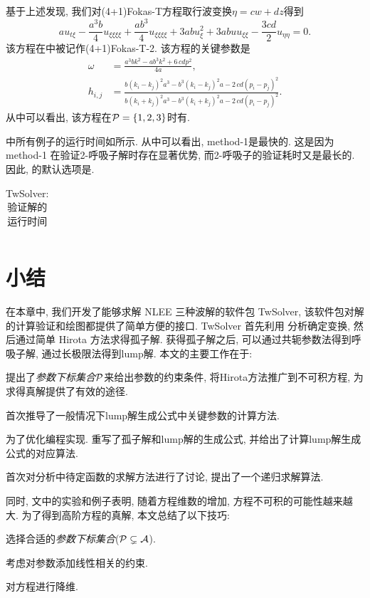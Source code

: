 基于上述发现, 我们对(4+1)Fokas-T方程取行波变换$\eta=cw+dz$得到
\begin{equation}
    au_{t\xi}-\frac{a^3b}{4}u_{\xi\xi\xi\xi}+\frac{ab^3}{4}u_{\xi\xi\xi\xi}+3abu_{\xi}^2+3abuu_{\xi\xi}-\frac{3cd}{2}u_{\eta\eta}=0.  \label{Fokas-T-2}
\end{equation}
该方程在中被记作(4+1)Fokas-T-2. 该方程的关键参数是
\begin{equation}
\begin{split}
    \omega&={\frac {{a}^{3}b{k}^{2}-a{b}^{3}{k}^{2}+6\,cd{p}^{2}}{4a}}, \\ 
    h_{{i,j}}&={\frac {b \left( k_{{i}}-k_{{j}} \right) ^{2}{a}^{3}-{b}^{3}
    \left( k_{{i}}-k_{{j}} \right) ^{2}a-2\,cd \left( p_{{i}}-p_{{j}}
    \right) ^{2}}{b \left( k_{{i}}+k_{{j}} \right) ^{2}{a}^{3}-{b}^{3}
    \left( k_{{i}}+k_{{j}} \right) ^{2}a-2\,cd \left( p_{{i}}-p_{{j}}
    \right) ^{2}}}.
\end{split}
\end{equation}
从中可以看出, 该方程在$\mathcal{P}=\{1,2,3\}$时有\TrueSol{}.

中所有例子的运行时间如所示. 从中可以看出, method-1是最快的. 这是因为 method-1 在验证2-呼吸子解时存在显著优势, 而2-呼吸子的验证耗时又是最长的. 因此, 的默认选项是. 

\begin{table}[htbp]
\centering 
\caption{TwSolver: 验证解的运行时间} \label{runtime}
\begin{tabular}{c|ccc|c}
\hline

\hline
\end{tabular}
\end{table}

\section{小结}
在本章中, 我们开发了能够求解 NLEE 三种波解的软件包 TwSolver, 该软件包对解的计算\D 验证和绘图都提供了简单方便的接口. TwSolver 首先利用 \Painleve{} 分析确定变换, 然后通过简单 Hirota 方法求得孤子解. 获得孤子解之后, 可以通过共轭参数法得到呼吸子解, 通过长极限法得到lump解.  本文的主要工作在于: 
\begin{compactenum}[(1)]
\item 提出了\emph{参数下标集合}$\mathcal{P}$来给出参数的约束条件, 将Hirota方法推广到不可积方程, 为求得真解提供了有效的途径. 
\item 首次推导了一般情况下lump解生成公式中关键参数的计算方法.
\item 为了优化编程实现. 重写了孤子解和lump解的生成公式, 并给出了计算lump解生成公式的对应算法.
\item 首次对\Painleve{}分析中待定函数的求解方法进行了讨论, 提出了一个递归求解算法. 
\end{compactenum}

同时, 文中的实验和例子表明, 随着方程维数的增加, 方程不可积的可能性越来越大. 为了得到高阶方程的真解, 本文总结了以下技巧:
\begin{compactenum}[(1)]
\item 选择合适的\emph{参数下标集合}($\mathcal{P}\subsetneq  \mathcal{A}$). 
\item 考虑对参数添加线性相关的约束.
\item 对方程进行降维.
\end{compactenum}
